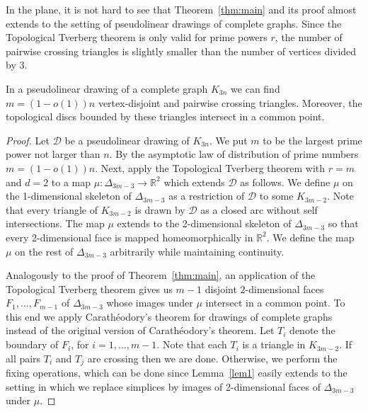 \documentclass[english,a4paper,nolineno]{lipics-v2019}
\begin{document}
{In the plane, it is not hard to see that  Theorem~\ref{thm:main} and its proof almost extends to the setting of  pseudolinear drawings of complete graphs. Since the Topological Tverberg theorem is only valid for prime powers $r$, the number of pairwise crossing triangles is slightly smaller than the number of vertices divided by 3.

\begin{theorem} \label{thm:mainTopPlane}
In a pseudolinear drawing of a complete graph  $K_{3n}$  we can find $m=(1-o(1))n$ vertex-disjoint and pairwise crossing triangles. Moreover, the topological discs bounded by these triangles intersect in a common point.
\end{theorem}

\begin{proof}
Let $\mathcal{D}$ be a pseudolinear drawing of  $K_{3n}$.
We put $m$ to be the largest prime power not larger than  $n$.
By the asymptotic law of distribution of prime numbers  $m=(1-o(1))n$.
Next, apply the Topological Tverberg theorem with $r=m$ and $d=2$ to a map $\mu:\Delta_{3m-3}\rightarrow \mathbb{R}^2$
which extends $\mathcal{D}$  as follows.
We define $\mu$ on the 1-dimensional skeleton of $\Delta_{3m-3}$ as  a restriction of $\mathcal{D}$  to some $K_{3m-2}$.
Note that every triangle of $K_{3m-2}$ is drawn by $\mathcal{D}$ as a closed arc without self intersections. The map $\mu$ extends to the 2-dimensional skeleton of $\Delta_{3m-3}$ so that every  2-dimensional face is mapped homeomorphically in $\mathbb{R}^2$. We  define the map $\mu$ on the rest of $\Delta_{3m-3}$ arbitrarily while maintaining continuity.

Analogously to the proof of Theorem~\ref{thm:main}, an application of the Topological Tverberg theorem gives us $m-1$ disjoint $2$-dimensional faces $F_1,\ldots, F_{m-1}$ of $\Delta_{3m-3}$ whose images under $\mu$ intersect in a common point.
 To this end we apply Carath\'eodory's theorem for drawings of complete graphs~\cite[Lemma 4.7]{BFK15_monotone} instead of the original version of Carath\'eodory's theorem.
Let $T_i$ denote the boundary of $F_i$, for $i=1,\ldots, m-1$.
Note that each $T_i$ is a triangle in $K_{3m-2}$.
If all pairs $T_i$ and $T_j$ are crossing then we are done. Otherwise, we perform the fixing operations, which can be done since  Lemma~\ref{lem1} easily extends to the setting in which  we replace simplices  by images of 2-dimensional faces of $\Delta_{3m-3}$  under $\mu$.


\end{proof}}
\end{document}
